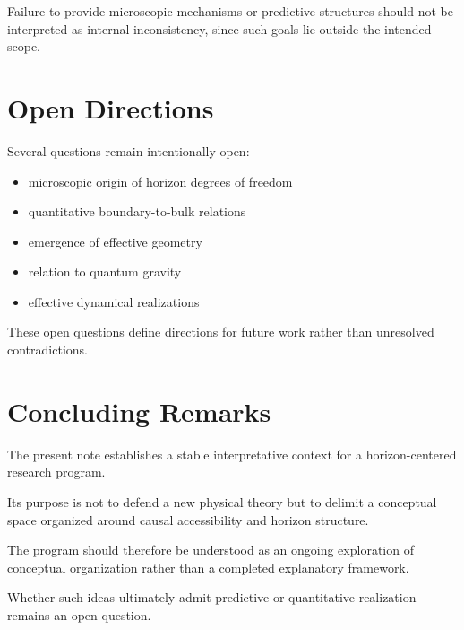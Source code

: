 \documentclass[12pt,a4paper]{article}
\begin{document}
Failure to provide microscopic mechanisms or predictive structures should not be interpreted as internal inconsistency, since such goals lie outside the intended scope.

\section{Open Directions}

Several questions remain intentionally open:

\begin{itemize}
  \item microscopic origin of horizon degrees of freedom
  \item quantitative boundary-to-bulk relations
  \item emergence of effective geometry
  \item relation to quantum gravity
  \item effective dynamical realizations
\end{itemize}

These open questions define directions for future work rather than unresolved contradictions.

\section{Concluding Remarks}

The present note establishes a stable interpretative context for a horizon-centered research program.

Its purpose is not to defend a new physical theory but to delimit a conceptual space organized around causal accessibility and horizon structure.

The program should therefore be understood as an ongoing exploration of conceptual organization rather than a completed explanatory framework.

Whether such ideas ultimately admit predictive or quantitative realization remains an open question.
\end{document}
